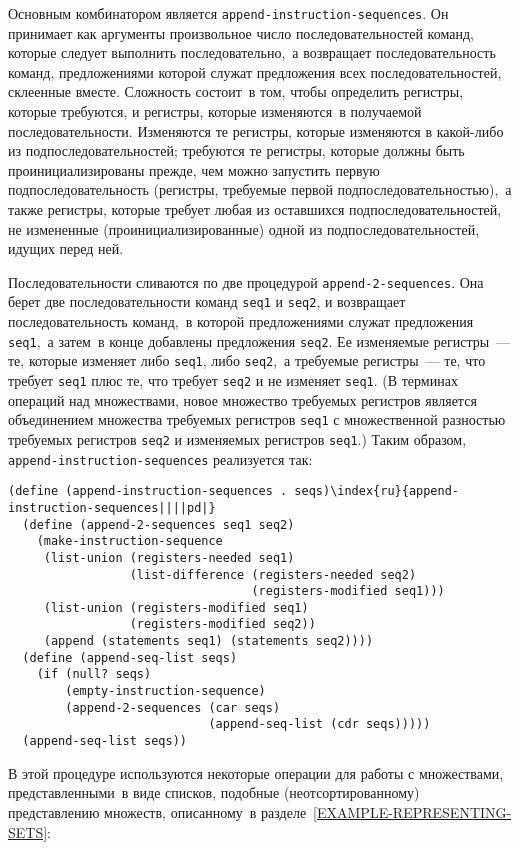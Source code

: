 Основным комбинатором является
{\tt append-instruction-sequences}.  Он принимает как аргументы
произвольное число последовательностей команд, которые следует
выполнить последовательно,~а возвращает последовательность команд,
предложениями которой служат предложения всех последовательностей, склеенные
вместе.  Сложность состоит~в том, чтобы определить регистры, которые
требуются, и регистры, которые изменяются~в получаемой
последовательности.  Изменяются те регистры, которые изменяются в
какой-либо из подпоследовательностей; требуются те регистры, которые
должны быть проинициализированы прежде, чем можно запустить первую
подпоследовательность (регистры, требуемые первой
подпоследовательностью),~а также регистры, которые требует любая из
оставшихся подпоследовательностей, не измененные
(проинициализированные) одной из подпоследовательностей, идущих перед
ней.
{\sloppy

}
Последовательности сливаются по две процедурой
{\tt append-2-sequences}.  Она берет две последовательности
команд {\tt seq1} и {\tt seq2}, и возвращает
последовательность команд,~в которой предложениями служат предложения
{\tt seq1},~а затем~в конце добавлены предложения
{\tt seq2}. Ее изменяемые регистры~--- те, которые
изменяет либо {\tt seq1}, либо {\tt seq2},~а требуемые
регистры~--- те, что требует {\tt seq1} плюс
те, что требует {\tt seq2} и не изменяет
{\tt seq1}.  (В терминах операций над множествами, новое
множество требуемых регистров является объединением множества
требуемых регистров {\tt seq1} с множественной разностью
требуемых регистров {\tt seq2} и изменяемых регистров
{\tt seq1}.)  Таким образом,
{\tt append-instruction-sequences} реализуется так:

\begin{Verbatim}[fontsize=\small]
(define (append-instruction-sequences . seqs)\index{ru}{append-instruction-sequences||||pd|}
  (define (append-2-sequences seq1 seq2)
    (make-instruction-sequence
     (list-union (registers-needed seq1)
                 (list-difference (registers-needed seq2)
                                  (registers-modified seq1)))
     (list-union (registers-modified seq1)
                 (registers-modified seq2))
     (append (statements seq1) (statements seq2))))
  (define (append-seq-list seqs)
    (if (null? seqs)
        (empty-instruction-sequence)
        (append-2-sequences (car seqs)
                            (append-seq-list (cdr seqs)))))
  (append-seq-list seqs))
\end{Verbatim}

В этой процедуре используются некоторые операции для работы
с множествами, представленными~в виде списков, подобные
(неотсортированному) представлению множеств, описанному~в 
разделе~\ref{EXAMPLE-REPRESENTING-SETS}:

